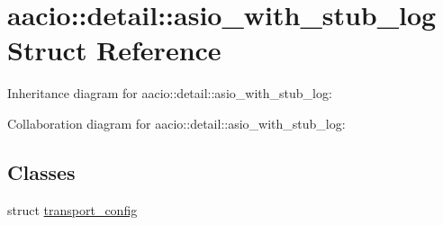 \hypertarget{structaacio_1_1detail_1_1asio__with__stub__log}{}\section{aacio\+:\+:detail\+:\+:asio\+\_\+with\+\_\+stub\+\_\+log Struct Reference}
\label{structaacio_1_1detail_1_1asio__with__stub__log}


Inheritance diagram for aacio\+:\+:detail\+:\+:asio\+\_\+with\+\_\+stub\+\_\+log\+:


Collaboration diagram for aacio\+:\+:detail\+:\+:asio\+\_\+with\+\_\+stub\+\_\+log\+:
\subsection*{Classes}
\begin{DoxyCompactItemize}
\item 
struct \mbox{\hyperlink{structaacio_1_1detail_1_1asio__with__stub__log_1_1transport__config}{transport\+\_\+config}}
\end{DoxyCompactItemize}
